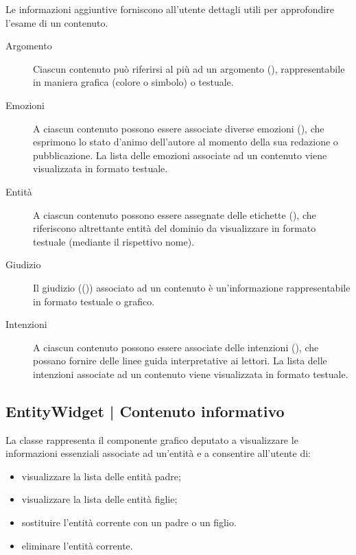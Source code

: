 \documentclass[10pt,a4paper,headinclude,footinclude,hidelinks]{scrreprt} %
\begin{document}
	Le informazioni aggiuntive forniscono all'utente dettagli utili per approfondire l'esame di un contenuto.
	\begin{description}
	\item[Argomento] Ciascun contenuto può riferirsi al più ad un argomento (\textit{}), rappresentabile in maniera grafica (colore o simbolo) o testuale.
	\item[Emozioni] A ciascun contenuto possono essere associate diverse emozioni (\textit{}), che esprimono lo stato d'animo dell'autore al momento della sua redazione o pubblicazione. La lista delle emozioni associate ad un contenuto viene visualizzata in formato testuale.
	\item[Entit\`a] A ciascun contenuto possono essere assegnate delle etichette (\textit{}), che riferiscono altrettante entità del dominio da visualizzare in formato testuale (mediante il rispettivo nome).
	\item[Giudizio] Il giudizio ((\textit{})) associato ad un contenuto è un'informazione rappresentabile in formato testuale o grafico.
	\item[Intenzioni] A ciascun contenuto possono essere associate delle intenzioni (\textit{}), che possano fornire delle linee guida interpretative ai lettori. La lista delle intenzioni associate ad un contenuto viene visualizzata in formato testuale.
	\end{description}

	\subsection[EntityWidget]{EntityWidget | Contenuto informativo}
	\label{sec:stage:design:sistema:view:entity-widget}
	La classe \textit{} rappresenta il componente grafico deputato a visualizzare le informazioni essenziali associate ad un'entità e a consentire all'utente di:
	\begin{itemize}
	\item visualizzare la lista delle entità padre;
	\item visualizzare la lista delle entità figlie;
	\item sostituire l'entità corrente con un padre o un figlio.
	\item eliminare l'entità corrente.
	\end{itemize}
\end{document}
